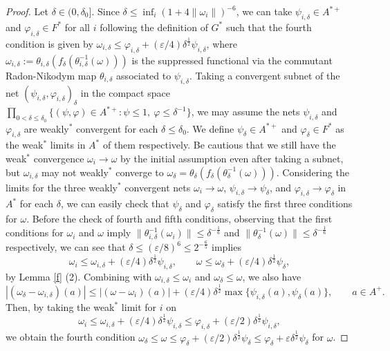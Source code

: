 \documentclass[noamsfonts,a4paper,10pt]{amsart}
\theoremstyle{plain}
\theoremstyle{definition}
\theoremstyle{remark}
\begin{document}
\begin{proof}
Let $\delta\in(0,\delta_0]$.
Since $\delta\le\inf_i(1+4\|\omega_i\|)^{-6}$, we can take $\psi_{i,\delta}\in A^{*+}$ and $\varphi_{i,\delta}\in F^*$ for all $i$ following the definition of $G^*$ such that the fourth condition is given by $\omega_{i,\delta}\le\varphi_{i,\delta}+(\varepsilon/4)\delta^{\frac12}\psi_{i,\delta}$, where $\omega_{i,\delta}:=\theta_{i,\delta}(f_\delta(\theta_{i,\delta}^{-1}(\omega)))$ is the suppressed functional via the commutant Radon-Nikodym map $\theta_{i,\delta}$ associated to $\psi_{i,\delta}$.
Taking a convergent subnet of the net $(\psi_{i,\delta},\varphi_{i,\delta})_\delta$ in the compact space $\prod_{0<\delta\le\delta_0}\{(\psi,\varphi)\in A^{*+}:\psi\le1,\ \varphi\le\delta^{-1}\}$, we may assume the nets $\psi_{i,\delta}$ and $\varphi_{i,\delta}$ are weakly$^*$ convergent for each $\delta\le\delta_0$.
We define $\psi_\delta\in A^{*+}$ and $\varphi_\delta\in F^*$ as the weak$^*$ limits in $A^*$ of them respectively.
Be cautious that we still have the weak$^*$ convergence $\omega_i\to\omega$ by the initial assumption even after taking a subnet, but $\omega_{i,\delta}$ may not weakly$^*$ converge to $\omega_\delta=\theta_\delta(f_\delta(\theta_\delta^{-1}(\omega)))$.
Considering the limits for the three weakly$^*$ convergent nets $\omega_i\to\omega$, $\psi_{i,\delta}\to\psi_\delta$, and $\varphi_{i,\delta}\to\varphi_\delta$ in $A^*$ for each $\delta$, we can easily check that $\psi_\delta$ and $\varphi_\delta$ satisfy the first three conditions for $\omega$.
Before the check of fourth and fifth conditions, observing that the first conditions for $\omega_i$ and $\omega$ imply $\|\theta_{i,\delta}^{-1}(\omega_i)\|\le\delta^{-\frac16}$ and $\|\theta_\delta^{-1}(\omega)\|\le\delta^{-\frac16}$ respectively, we can see that $\delta\le(\varepsilon/8)^6\le2^{-\frac65}$ implies
\[\omega_i\le\omega_{i,\delta}+(\varepsilon/4)\delta^{\frac12}\psi_{i,\delta},\qquad\omega\le\omega_\delta+(\varepsilon/4)\delta^{\frac12}\psi_\delta,\]
by Lemma \ref{f} (2).
Combining with $\omega_{i,\delta}\le\omega_i$ and $\omega_\delta\le\omega$, we also have
\[|(\omega_\delta-\omega_{i,\delta})(a)|\le|(\omega-\omega_i)(a)|+(\varepsilon/4)\delta^{\frac12}\max\{\psi_{i,\delta}(a),\psi_\delta(a)\},\qquad a\in A^+.\]
Then, by taking the weak$^*$ limit for $i$ on
\[\omega_i\le\omega_{i,\delta}+(\varepsilon/4)\delta^{\frac12}\psi_{i,\delta}\le\varphi_{i,\delta}+(\varepsilon/2)\delta^{\frac12}\psi_{i,\delta},\]
we obtain the fourth condition $\omega_\delta\le\omega\le\varphi_\delta+(\varepsilon/2)\delta^{\frac12}\psi_\delta\le\varphi_\delta+\varepsilon\delta^{\frac12}\psi_\delta$ for $\omega$.

\end{proof}
\end{document}
